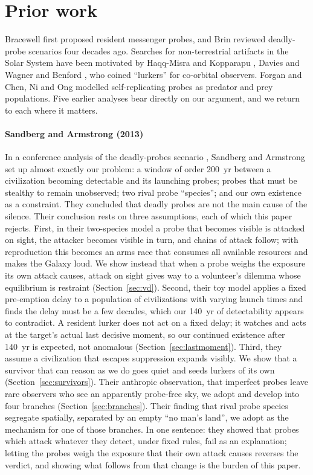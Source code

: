 \documentclass[preprint,12pt]{elsarticle}
\theoremstyle{definition}
\begin{document}
\section{Prior work}
\label{sec:prior}

Bracewell \citep{Bracewell1960} first proposed resident messenger probes, and Brin \citep{Brin1983} reviewed deadly-probe scenarios four decades ago. Searches for non-terrestrial artifacts in the Solar System have been motivated by Haqq-Misra and Kopparapu \citep{HaqqMisraKopparapu2012}, Davies and Wagner \citep{DaviesWagner2013} and Benford \citep{Benford2019}, who coined ``lurkers'' for co-orbital observers. Forgan \citep{Forgan2019} and Chen, Ni and Ong \citep{Chen2022} modelled self-replicating probes as predator and prey populations. Five earlier analyses bear directly on our argument, and we return to each where it matters.

\paragraph{Sandberg and Armstrong (2013)}
In a conference analysis of the deadly-probes scenario \citep{SandbergArmstrong2013}, Sandberg and Armstrong set up almost exactly our problem: a window of order 200~yr between a civilization becoming detectable and its launching probes; probes that must be stealthy to remain unobserved; two rival probe ``species''; and our own existence as a constraint. They concluded that deadly probes are not the main cause of the silence. Their conclusion rests on three assumptions, each of which this paper rejects. First, in their two-species model a probe that becomes visible is attacked on sight, the attacker becomes visible in turn, and chains of attack follow; with reproduction this becomes an arms race that consumes all available resources and makes the Galaxy loud. We show instead that when a probe weighs the exposure its own attack causes, attack on sight gives way to a volunteer's dilemma whose equilibrium is restraint (Section~\ref{sec:vd}). Second, their toy model applies a fixed pre-emption delay to a population of civilizations with varying launch times and finds the delay must be a few decades, which our 140~yr of detectability appears to contradict. A resident lurker does not act on a fixed delay; it watches and acts at the target's actual last decisive moment, so our continued existence after 140~yr is expected, not anomalous (Section~\ref{sec:lastmoment}). Third, they assume a civilization that escapes suppression expands visibly. We show that a survivor that can reason as we do goes quiet and seeds lurkers of its own (Section~\ref{sec:survivors}). Their anthropic observation, that imperfect probes leave rare observers who see an apparently probe-free sky, we adopt and develop into four branches (Section~\ref{sec:branches}). Their finding that rival probe species segregate spatially, separated by an empty ``no man's land'', we adopt as the mechanism for one of those branches. In one sentence: they showed that probes which attack whatever they detect, under fixed rules, fail as an explanation; letting the probes weigh the exposure that their own attack causes reverses the verdict, and showing what follows from that change is the burden of this paper.
\end{document}
